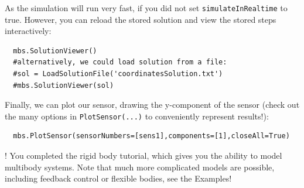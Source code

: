 \noindent As the simulation will run very fast, if you did not set \texttt{simulateInRealtime} to true. However, you can reload the stored solution and view the stored steps interactively:
\pythonstyle\begin{lstlisting}
  mbs.SolutionViewer()
  #alternatively, we could load solution from a file:
  #sol = LoadSolutionFile('coordinatesSolution.txt')
  #mbs.SolutionViewer(sol)
\end{lstlisting}

\noindent Finally, we can plot our sensor, drawing the y-component of the sensor (check out the many options in \texttt{PlotSensor(...)} to conveniently represent results!):
\pythonstyle\begin{lstlisting}
  mbs.PlotSensor(sensorNumbers=[sens1],components=[1],closeAll=True)
\end{lstlisting}

\noindent {}! You completed the rigid body tutorial, which gives you the ability to model multibody systems. Note that much more complicated models are possible, including feedback control or flexible bodies, see the Examples!




